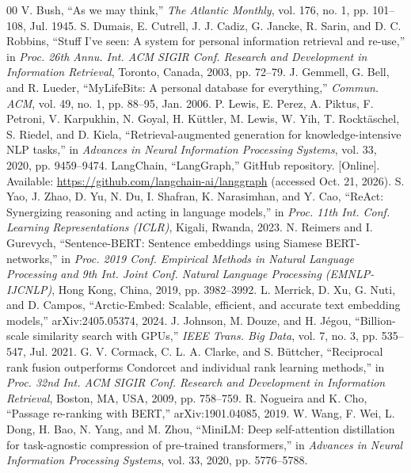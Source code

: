 \documentclass[conference]{IEEEtran}
\begin{document}
\begin{thebibliography}{00}
 V. Bush, ``As we may think,'' \textit{The Atlantic Monthly}, vol. 176, no. 1, pp. 101--108, Jul. 1945.
 S. Dumais, E. Cutrell, J. J. Cadiz, G. Jancke, R. Sarin, and D. C. Robbins, ``Stuff I've seen: A system for personal information retrieval and re-use,'' in \textit{Proc. 26th Annu. Int. ACM SIGIR Conf. Research and Development in Information Retrieval}, Toronto, Canada, 2003, pp. 72--79.
 J. Gemmell, G. Bell, and R. Lueder, ``MyLifeBits: A personal database for everything,'' \textit{Commun. ACM}, vol. 49, no. 1, pp. 88--95, Jan. 2006.
 P. Lewis, E. Perez, A. Piktus, F. Petroni, V. Karpukhin, N. Goyal, H. K\"{u}ttler, M. Lewis, W. Yih, T. Rockt\"{a}schel, S. Riedel, and D. Kiela, ``Retrieval-augmented generation for knowledge-intensive NLP tasks,'' in \textit{Advances in Neural Information Processing Systems}, vol. 33, 2020, pp. 9459--9474.
 LangChain, ``LangGraph,'' GitHub repository. [Online]. Available: \url{https://github.com/langchain-ai/langgraph} (accessed Oct. 21, 2026).
 S. Yao, J. Zhao, D. Yu, N. Du, I. Shafran, K. Narasimhan, and Y. Cao, ``ReAct: Synergizing reasoning and acting in language models,'' in \textit{Proc. 11th Int. Conf. Learning Representations (ICLR)}, Kigali, Rwanda, 2023.
 N. Reimers and I. Gurevych, ``Sentence-BERT: Sentence embeddings using Siamese BERT-networks,'' in \textit{Proc. 2019 Conf. Empirical Methods in Natural Language Processing and 9th Int. Joint Conf. Natural Language Processing (EMNLP-IJCNLP)}, Hong Kong, China, 2019, pp. 3982--3992.
 L. Merrick, D. Xu, G. Nuti, and D. Campos, ``Arctic-Embed: Scalable, efficient, and accurate text embedding models,'' arXiv:2405.05374, 2024.
 J. Johnson, M. Douze, and H. J\'{e}gou, ``Billion-scale similarity search with GPUs,'' \textit{IEEE Trans. Big Data}, vol. 7, no. 3, pp. 535--547, Jul. 2021.
 G. V. Cormack, C. L. A. Clarke, and S. B\"{u}ttcher, ``Reciprocal rank fusion outperforms Condorcet and individual rank learning methods,'' in \textit{Proc. 32nd Int. ACM SIGIR Conf. Research and Development in Information Retrieval}, Boston, MA, USA, 2009, pp. 758--759.
 R. Nogueira and K. Cho, ``Passage re-ranking with BERT,'' arXiv:1901.04085, 2019.
 W. Wang, F. Wei, L. Dong, H. Bao, N. Yang, and M. Zhou, ``MiniLM: Deep self-attention distillation for task-agnostic compression of pre-trained transformers,'' in \textit{Advances in Neural Information Processing Systems}, vol. 33, 2020, pp. 5776--5788.

\end{thebibliography}
\end{document}
